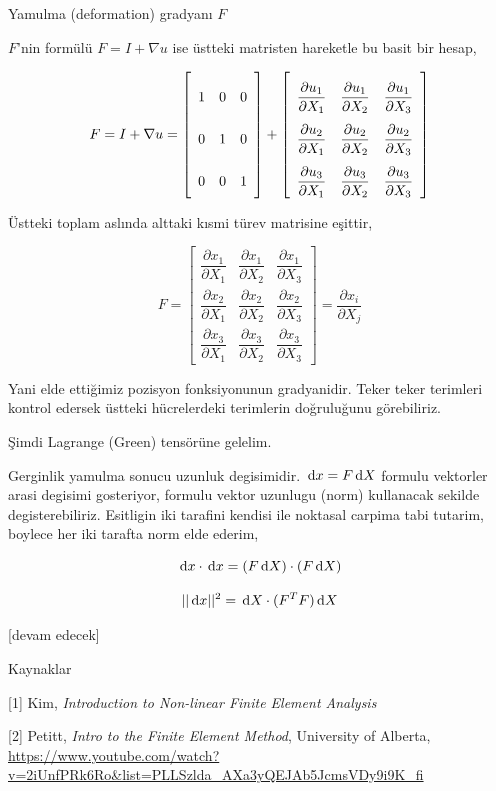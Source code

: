\documentclass[12pt,fleqn]{article}\usepackage{../../common}
\begin{document}
Yamulma (deformation) gradyanı $F$

$F$'nin formülü $F = I + \nabla u$ ise üstteki matristen hareketle bu basit
bir hesap,

$$
F = I + \nabla u = 
\left[\begin{array}{ccc}
1 & 0 & 0 \\ 0 & 1 & 0 \\ 0 & 0 & 1
\end{array}\right] + 
\renewcommand*{\arraystretch}{2.5}
\left[\begin{array}{ccc}
\dfrac{\partial u_1}{\partial X_1} & \dfrac{\partial u_1}{\partial X_2} & \dfrac{\partial u_1}{\partial X_3} \\
\dfrac{\partial u_2}{\partial X_1} & \dfrac{\partial u_2}{\partial X_2} & \dfrac{\partial u_2}{\partial X_3} \\
\dfrac{\partial u_3}{\partial X_1} & \dfrac{\partial u_3}{\partial X_2} & \dfrac{\partial u_3}{\partial X_3} 
\end{array}\right]
$$

Üstteki toplam aslında alttaki kısmi türev matrisine eşittir,

$$
\renewcommand*{\arraystretch}{2.5}
F = \left[\begin{array}{ccc}
\dfrac{\partial x_1}{\partial X_1} & \dfrac{\partial x_1}{\partial X_2} & \dfrac{\partial x_1}{\partial X_3} \\
\dfrac{\partial x_2}{\partial X_1} & \dfrac{\partial x_2}{\partial X_2} & \dfrac{\partial x_2}{\partial X_3} \\
\dfrac{\partial x_3}{\partial X_1} & \dfrac{\partial x_3}{\partial X_2} & \dfrac{\partial x_3}{\partial X_3} 
\end{array}\right] =
\frac{\partial x_i}{\partial X_j}
$$

Yani elde ettiğimiz pozisyon fonksiyonunun gradyanidir. Teker teker terimleri
kontrol edersek üstteki hücrelerdeki terimlerin doğruluğunu görebiliriz.

Şimdi Lagrange (Green) tensörüne gelelim.

Gerginlik yamulma sonucu uzunluk degisimidir. $\,\mathrm{d} x = F \,\mathrm{d} X$ formulu
vektorler arasi degisimi gosteriyor, formulu vektor uzunlugu (norm) kullanacak
sekilde degisterebiliriz. Esitligin iki tarafini kendisi ile noktasal carpima
tabi tutarim, boylece her iki tarafta norm elde ederim,

$$
\,\mathrm{d} x \cdot \,\mathrm{d} x  = (F \,\mathrm{d} X) \cdot (F \,\mathrm{d} X)
$$

$$
||\,\mathrm{d} x||^2  = \,\mathrm{d} X \cdot (F^T F) \,\mathrm{d} X
$$




[devam edecek]

Kaynaklar

[1] Kim, {\em Introduction to Non-linear Finite Element Analysis}

[2] Petitt, {\em Intro to the Finite Element Method}, University of Alberta,
    \url{https://www.youtube.com/watch?v=2iUnfPRk6Ro&list=PLLSzlda_AXa3yQEJAb5JcmsVDy9i9K_fi}
\end{document}
